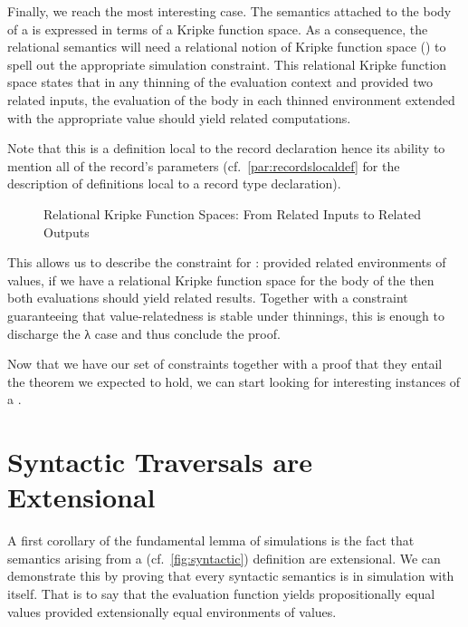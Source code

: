 Finally, we reach the most interesting case. The semantics attached to the
body of a  is expressed in terms of a Kripke function space. As
a consequence, the relational semantics will need a relational notion of
Kripke function space () to spell out the appropriate simulation
constraint. This relational Kripke function space states that in any
thinning of the evaluation context and provided two related inputs, the
evaluation of the body in each thinned environment extended with the
appropriate value should yield related computations.

Note that this is a definition local to the  record declaration hence
its ability to mention all of the record's parameters (cf.~\cref{par:recordslocaldef}
for the description of definitions local to a record type declaration).

\begin{figure}[h]
\caption{Relational Kripke Function Spaces: From Related Inputs to Related Outputs\label{fig:relationalkripke}}
\end{figure}

This allows us to describe the constraint for : provided related
environments of values, if we have a relational Kripke function space for
the body of the  then both evaluations should yield related
results. Together with a constraint guaranteeing that value-relatedness
is stable under thinnings, this is enough to discharge the λ case and thus
conclude the proof.

\begin{AgdaSuppressSpace}
\end{AgdaSuppressSpace}

Now that we have our set of constraints together with a proof that they
entail the theorem we expected to hold, we can start looking for interesting
instances of a .

\section{Syntactic Traversals are Extensional}

A first corollary of the fundamental lemma of simulations is the fact that semantics
arising from a  (cf.~\cref{fig:syntactic}) definition are extensional. We
can demonstrate this by proving that every syntactic semantics is in simulation with
itself. That is to say that the evaluation function yields propositionally equal
values provided extensionally equal environments of values.


